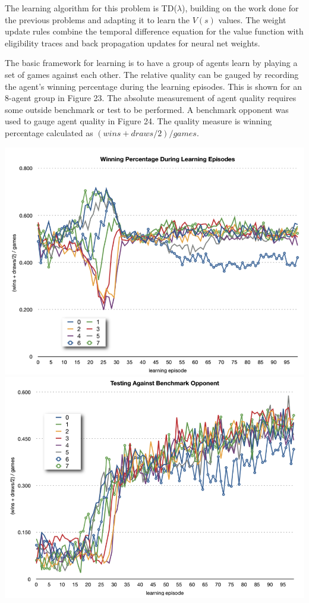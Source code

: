 \documentclass[11pt]{article} %
\begin{document}
\begin{flushleft}

The learning algorithm for this problem is TD($\lambda$), building on the work done for the previous problems and adapting it to learn the $V(s)$ values.  The weight update rules combine the temporal difference equation for the value function with eligibility traces and back propagation updates for neural net weights.

The basic framework for learning is to have a group of agents learn by playing a set of games against each other.  The relative quality can be gauged by recording the agent’s winning percentage during the learning episodes.  This is shown for an 8-agent group in Figure 23.  The absolute measurement of agent quality requires some outside benchmark or test to be performed.  A benchmark opponent was used to gauge agent quality in Figure 24.  The quality measure is winning percentage calculated as $(wins + draws/2)/games$.

\end{flushleft}
\center
\includegraphics[scale=0.8]{fig12}
\includegraphics[scale=0.8]{fig13}
\end{document}
